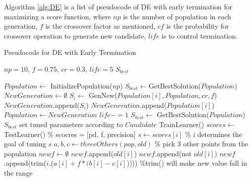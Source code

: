 \documentclass{sig-alternative}
\begin{document}
Algorithm \ref{alg:DE} is a list of pseudocode of DE with early termination for maximizing a 
score function, where $np$ is the number of population in each generation, $f$ is the 
crossover factor as mentioned, $cf$ is the probability for crossover operation to generate new 
candidate, $life$ is to control termination.

\begin{algorithm}
\caption{Pesudocode for DE with Early Termination}
\label{alg:DE}
\begin{algorithmic}[1]
\Require $np = 10$, $f=0.75$, $cr=0.3$, $life = 5$
\Ensure $S_{best}$
     
 \State $Population  \gets $ InitializePopulation($np$)
 \State $S_{best} \gets $GetBestSolution($Population $)
\State $NewGeneration \gets \emptyset$
\State $S_i \gets$ GenNew($Population [i], Population , cr, f$)
\State $NewGeneration$.append($S_i$)
\Else
\State $NewGeneration$.append($Population [i]$)
\EndIf
\EndFor
\State $Population  \gets NewGeneration$
\State $life -=1$
\EndIf
\State $S_{best} \gets$ GetBestSolution($Population $)
 \EndWhile
\State \Return $S_{best}$
\EndFunction
{}
   \State set tuned parameters according to $Candidate$
   \State TrainLearner()
   \State $scores \gets$TestLearner()
   \State \% scocres = [pd, f, precision]
   \State $s \gets scores[i] $ 
   \State \% i determines the goal of tuning
   \State \Return$s$
\EndFunction
{}
  \State $a, b, c\gets threeOthers(pop,old)$ 
  \State \% pick 3 other points from the population
  \State $newf \gets \emptyset$
         \State $newf$.append($old[i]$)
                \Else
                    \State $newf$.append(not $old[i]$)
         \Else
          \State $newf$.append(trim($i$,($a[i] + f * (b[i] - c[i]$))))
          \State \%trim() will make new value fall in the range
         \EndIf
       \EndIf
  \EndFor
\EndFunction
        \end{algorithmic}            
\end{algorithm}

\end{document}
